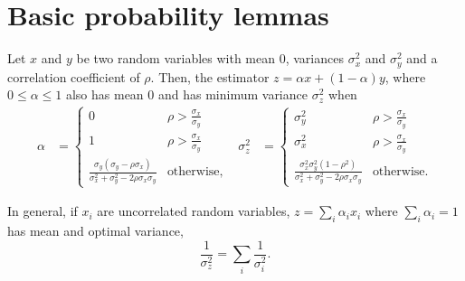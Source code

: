 \section{Basic probability lemmas}
\label{sec:probability}

\begin{lemma}
  \label{lem:combined-variance}
  Let $x$ and $y$ be two random variables with mean $0$, variances $\sigma^2_x$ and $\sigma^2_y$ and a correlation coefficient of $\rho$.
  Then, the estimator $z = \alpha x + (1-\alpha) y$, where $0 \le \alpha
  \le 1$ also has mean $0$ and has minimum variance $\sigma^2_z$ when
  \begin{align*}
  \alpha &= 
  \begin{cases}
    0 & \rho > \frac{\sigma_x}{\sigma_y} \\
    1 & \rho > \frac{\sigma_x}{\sigma_y} \\
    \frac{\sigma_y (\sigma_y - \rho \sigma_x)}{\sigma_x^2 + \sigma_y^2 - 2\rho \sigma_x \sigma_y} & \text{otherwise},
  \end{cases}
  &
  \sigma^2_z &= 
  \begin{cases}
    \sigma^2_y & \rho > \frac{\sigma_x}{\sigma_y} \\
    \sigma^2_x & \rho > \frac{\sigma_x}{\sigma_y} \\
    \frac{\sigma_x^2 \sigma_y^2 (1 - \rho^2)}{\sigma_x^2 + \sigma_y^2 - 2 \rho \sigma_x \sigma_y} & \text{otherwise}.
  \end{cases}
  \end{align*}

  In general, if $x_i$ are uncorrelated random variables, $z = \sum_{i} \alpha_i x_i$ where $\sum_i \alpha_i = 1$ has mean and optimal variance,
  $$\frac{1}{\sigma_z^2} = \sum_i \frac{1}{\sigma_i^2}.$$
\end{lemma}
